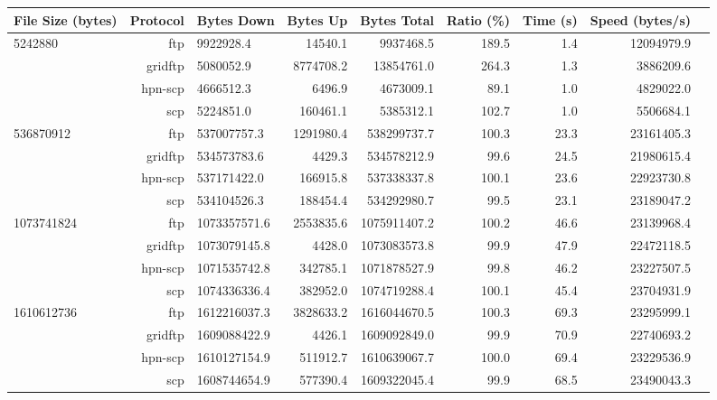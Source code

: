 \documentclass{sig-alternate-05-2015}
\begin{document}
\begin{table}
\centering
	\begin{tabular}{lrlrrrrrr}
	\toprule
	File Size (bytes) & Protocol &   Bytes Down &  Bytes Up &  Bytes Total &  Ratio (\%) &  Time (s) &  Speed (bytes/s) \\
	\midrule
	   5242880 &      ftp &    9922928.4 &   14540.1 &    9937468.5 &      189.5 &       1.4 &       12094979.9 \\
			   &  gridftp &    5080052.9 & 8774708.2 &   13854761.0 &      264.3 &       1.3 &        3886209.6 \\
			   &  hpn-scp &    4666512.3 &    6496.9 &    4673009.1 &       89.1 &       1.0 &        4829022.0 \\
			   &      scp &    5224851.0 &  160461.1 &    5385312.1 &      102.7 &       1.0 &        5506684.1 \\
	\midrule
	 536870912 &      ftp &  537007757.3 & 1291980.4 &  538299737.7 &      100.3 &      23.3 &       23161405.3 \\
			   &  gridftp &  534573783.6 &    4429.3 &  534578212.9 &       99.6 &      24.5 &       21980615.4 \\
			   &  hpn-scp &  537171422.0 &  166915.8 &  537338337.8 &      100.1 &      23.6 &       22923730.8 \\
			   &      scp &  534104526.3 &  188454.4 &  534292980.7 &       99.5 &      23.1 &       23189047.2 \\
	\midrule
	1073741824 &      ftp & 1073357571.6 & 2553835.6 & 1075911407.2 &      100.2 &      46.6 &       23139968.4 \\
	           &  gridftp & 1073079145.8 &    4428.0 & 1073083573.8 &       99.9 &      47.9 &       22472118.5 \\
	           &  hpn-scp & 1071535742.8 &  342785.1 & 1071878527.9 &       99.8 &      46.2 &       23227507.5 \\
	           &      scp & 1074336336.4 &  382952.0 & 1074719288.4 &      100.1 &      45.4 &       23704931.9 \\
	\midrule
	1610612736 &      ftp & 1612216037.3 & 3828633.2 & 1616044670.5 &      100.3 &      69.3 &       23295999.1 \\
	           &  gridftp & 1609088422.9 &    4426.1 & 1609092849.0 &       99.9 &      70.9 &       22740693.2 \\
	           &  hpn-scp & 1610127154.9 &  511912.7 & 1610639067.7 &      100.0 &      69.4 &       23229536.9 \\
	           &      scp & 1608744654.9 &  577390.4 & 1609322045.4 &       99.9 &      68.5 &       23490043.3 \\

\end{tabular}
\end{table}
\end{document}
